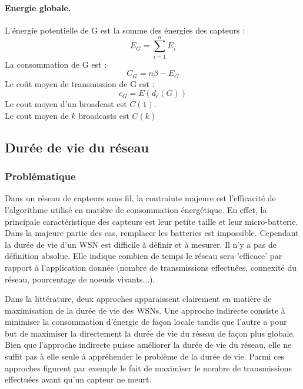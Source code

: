 \paragraph{Energie globale.}
\begin{mydef}
 L'énergie potentielle de G est la somme des énergies des capteurs :$$E_G=\sum_{i=1}^n{E_i}$$
 La consommation de  G est :$$C_G=n\beta - E_G$$
 Le coût moyen de transmission de  G est :$$c_G=E(d_e(G))$$
 Le cout moyen d'un broadcast est $C(1)$.\\
 Le cout moyen de $k$ broadcasts est $C(k)$
\end{mydef}


\subsection{Durée de vie du réseau}
\subsubsection{Problématique}


Dans un réseau de capteurs sans fil, la contrainte majeure est l'efficacité de l'algorithme utilisé en matière de consommation énergétique. En effet, la principale caractéristique des capteurs
est leur petite taille et leur micro-batterie. Dans la majeure partie des cas, remplacer les batteries est impossible. Cependant la durée de vie d'un WSN est difficile à définir et à mesurer.
Il n'y a pas de définition absolue. Elle indique combien de temps le réseau sera 'efficace' par rapport à l'application donnée (nombre de transmissions effectuées, connexité du réseau, pourcentage de noeuds vivants...).

Dans la littérature, deux approches apparaissent clairement en matière de maximisation de la durée de vie des WSNs. Une approche indirecte consiste à minimiser la consommation d'énergie de façon locale tandis que l'autre a pour but 
de maximiser la directement la durée de vie du réseau de façon plus globale. Bien que l'approche indirecte puisse améliorer la durée de vie du réseau, elle ne suffit pas à elle seule à appréhender le problème de la durée de vie.
Parmi ces approches figurent  par exemple le fait de maximiser le nombre de transmissions effectuées avant qu'un capteur ne meurt.

